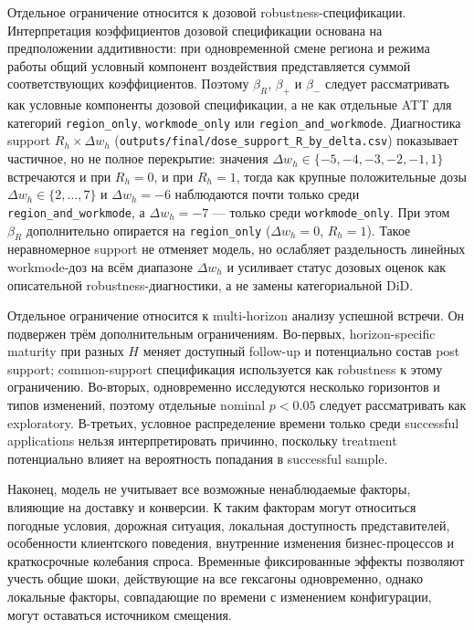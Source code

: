 \documentclass[14pt,a4paper]{extarticle}
\begin{document}
Отдельное ограничение относится к дозовой robustness-спецификации.
Интерпретация коэффициентов дозовой спецификации основана на предположении
аддитивности: при одновременной смене региона и режима работы общий условный
компонент воздействия представляется суммой соответствующих коэффициентов.
Поэтому \(\beta_R\), \(\beta_+\) и \(\beta_-\) следует рассматривать как
условные компоненты дозовой спецификации, а не как отдельные ATT для категорий
\texttt{region\_only}, \texttt{workmode\_only} или \texttt{region\_and\_workmode}.
Диагностика support \(R_h\times\Delta w_h\)
(\texttt{outputs/final/dose\_support\_R\_by\_delta.csv}) показывает частичное,
но не полное перекрытие: значения \(\Delta w_h\in\{-5,-4,-3,-2,-1,1\}\)
встречаются и при \(R_h=0\), и при \(R_h=1\), тогда как крупные положительные
дозы \(\Delta w_h\in\{2,\ldots,7\}\) и \(\Delta w_h=-6\) наблюдаются почти
только среди \texttt{region\_and\_workmode}, а \(\Delta w_h=-7\) --- только среди
\texttt{workmode\_only}. При этом \(\beta_R\) дополнительно опирается на
\texttt{region\_only} (\(\Delta w_h=0\), \(R_h=1\)). Такое неравномерное
support не отменяет модель, но ослабляет раздельность линейных workmode-доз
на всём диапазоне \(\Delta w_h\) и усиливает статус дозовых оценок как
описательной robustness-диагностики, а не замены категориальной DiD.

Отдельное ограничение относится к multi-horizon анализу успешной встречи. Он
подвержен трём дополнительным ограничениям. Во-первых, horizon-specific
maturity при разных \(H\) меняет доступный follow-up и потенциально состав
post support; common-support спецификация используется как robustness к этому
ограничению. Во-вторых, одновременно исследуются несколько горизонтов и типов
изменений, поэтому отдельные nominal \(p<0.05\) следует рассматривать как
exploratory. В-третьих, условное распределение времени только среди
successful applications нельзя интерпретировать причинно, поскольку treatment
потенциально влияет на вероятность попадания в successful sample.

Наконец, модель не учитывает все возможные ненаблюдаемые факторы, влияющие на доставку и конверсии. К таким факторам могут относиться погодные условия, дорожная ситуация, локальная доступность представителей, особенности клиентского поведения, внутренние изменения бизнес-процессов и краткосрочные колебания спроса. Временные фиксированные эффекты позволяют учесть общие шоки, действующие на все гексагоны одновременно, однако локальные факторы, совпадающие по времени с изменением конфигурации, могут оставаться источником смещения.
\end{document}
